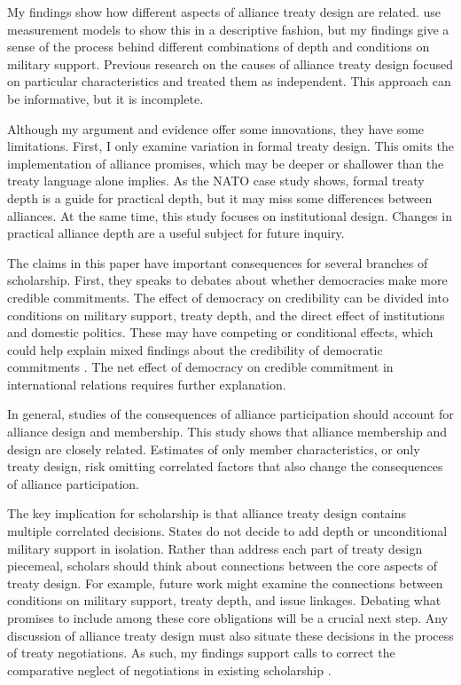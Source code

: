 \documentclass[12pt]{article}
\begin{document}
My findings show how different aspects of alliance treaty design are related. 
\citet{BensonClinton2016} use measurement models to show this in a descriptive fashion, but my findings give a sense of the process behind different combinations of depth and conditions on military support. 
Previous research on the causes of alliance treaty design \citep{Benson2012, Mattes2012, Chibaetal2015} focused on particular characteristics and treated them as independent. 
This approach can be informative, but it is incomplete. 


Although my argument and evidence offer some innovations, they have some limitations. 
First, I only examine variation in formal treaty design. 
This omits the implementation of alliance promises, which may be deeper or shallower than the treaty language alone implies. 
As the NATO case study shows, formal treaty depth is a guide for practical depth, but it may miss some differences between alliances. 
At the same time, this study focuses on institutional design. 
Changes in practical alliance depth are a useful subject for future inquiry. 


The claims in this paper have important consequences for several branches of scholarship. 
First, they speaks to debates about whether democracies make more credible commitments. 
The effect of democracy on credibility can be divided into conditions on military support, treaty depth, and the direct effect of institutions and domestic politics. 
These may have competing or conditional effects, which could help explain mixed findings about the credibility of democratic commitments \citep{Schultz1999, Leeds1999, Thyne2012, DownesSechser2012}.
The net effect of democracy on credible commitment in international relations requires further explanation. 


In general, studies of the consequences of alliance participation should account for alliance design and membership. 
This study shows that alliance membership and design are closely related. 
Estimates of only member characteristics, or only treaty design, risk omitting correlated factors that also change the consequences of alliance participation. 


The key implication for scholarship is that alliance treaty design contains multiple correlated decisions. 
States do not decide to add depth or unconditional military support in isolation. 
Rather than address each part of treaty design piecemeal, scholars should think about connections between the core aspects of treaty design. 
For example, future work might examine the connections between conditions on military support, treaty depth, and issue linkages.  
Debating what promises to include among these core obligations will be a crucial next step. 
Any discussion of alliance treaty design must also situate these decisions in the process of treaty negotiations.
As such, my findings support calls to correct the comparative neglect of negotiations in existing scholarship \citep{Poast2019a}. 
\end{document}
